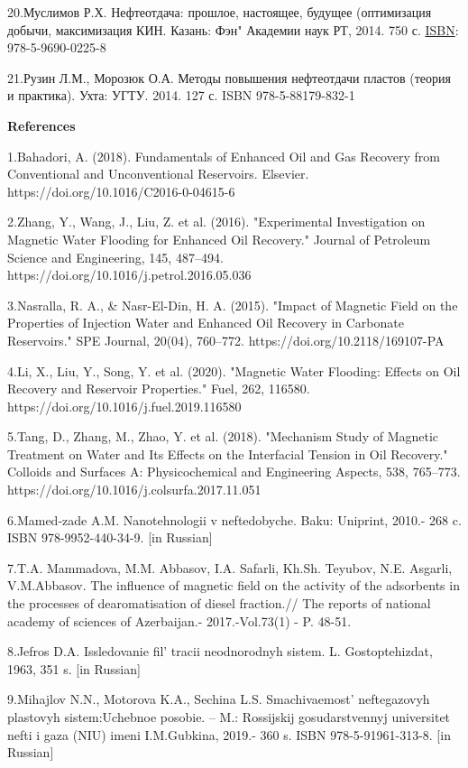 {{20.Муслимов Р.Х. Нефтеотдача: прошлое, настоящее, будущее (оптимизация
добычи, максимизация КИН. Казань: Фэн" Академии наук РТ, 2014. 750 с.
\href{https://www.libex.ru/qna/ref/isbn/}{ISBN}: 978-5-9690-0225-8

21.Рузин Л.М., Морозюк О.А. Методы повышения нефтеотдачи пластов (теория
и практика). Ухта: УГТУ. 2014. 127 с. ISBN 978-5-88179-832-1

{\bfseries References}

1.Bahadori, A. (2018). Fundamentals of Enhanced Oil and Gas Recovery
from Conventional and Unconventional Reservoirs. Elsevier.
https://doi.org/10.1016/C2016-0-04615-6

2.Zhang, Y., Wang, J., Liu, Z. et al. (2016). "Experimental
Investigation on Magnetic Water Flooding for Enhanced Oil Recovery."
Journal of Petroleum Science and Engineering, 145, 487--494.
https://doi.org/10.1016/j.petrol.2016.05.036

3.Nasralla, R. A., \& Nasr-El-Din, H. A. (2015). "Impact of Magnetic
Field on the Properties of Injection Water and Enhanced Oil Recovery in
Carbonate Reservoirs." SPE Journal, 20(04), 760--772.
https://doi.org/10.2118/169107-PA

4.Li, X., Liu, Y., Song, Y. et al. (2020). "Magnetic Water Flooding:
Effects on Oil Recovery and Reservoir Properties." Fuel, 262, 116580.
https://doi.org/10.1016/j.fuel.2019.116580

5.Tang, D., Zhang, M., Zhao, Y. et al. (2018). "Mechanism Study of
Magnetic Treatment on Water and Its Effects on the Interfacial Tension
in Oil Recovery." Colloids and Surfaces A: Physicochemical and
Engineering Aspects, 538, 765--773.
https://doi.org/10.1016/j.colsurfa.2017.11.051

6.Mamed-zade A.M. Nanotehnologii v neftedobyche. Baku: Uniprint, 2010.-
268 c. ISBN 978-9952-440-34-9. {[}in Russian{]}

7.T.A. Mammadova, M.M. Abbasov, I.A. Safarli, Kh.Sh. Teyubov, N.E.
Asgarli, V.M.Abbasov. The influence of magnetic field on the activity of
the adsorbents in the processes of dearomatisation of diesel fraction.//
The reports of national academy of sciences of Azerbaijan.-
2017.-Vol.73(1) - P. 48-51.

8.Jefros D.A. Issledovanie fil' tracii neodnorodnyh
sistem. L. Gostoptehizdat, 1963, 351 s. {[}in Russian{]}

9.Mihajlov N.N., Motorova K.A., Sechina L.S.
Smachivaemost'{} neftegazovyh plastovyh sistem:Uchebnoe
posobie. -- M.: Rossijskij gosudarstvennyj universitet nefti i gaza
(NIU) imeni I.M.Gubkina, 2019.- 360 s. ISBN 978-5-91961-313-8. {[}in
Russian{]}

}}
